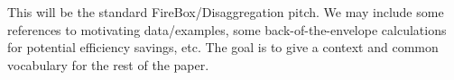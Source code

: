 This will be the standard FireBox/Disaggregation pitch. We may include some references to motivating data/examples, some back-of-the-envelope calculations for potential efficiency savings, etc. The goal is to give a context and common vocabulary for the rest of the paper.